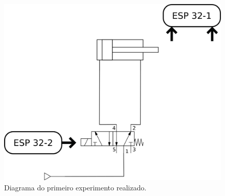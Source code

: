 \begin{figure}[htb]
    \begin{center}
	    \includegraphics[scale=0.5]{figs/diag_exp1.png}
	\end{center}
	\caption{\label{fig:exp1} Diagrama do primeiro experimento realizado.} 
\end{figure}

